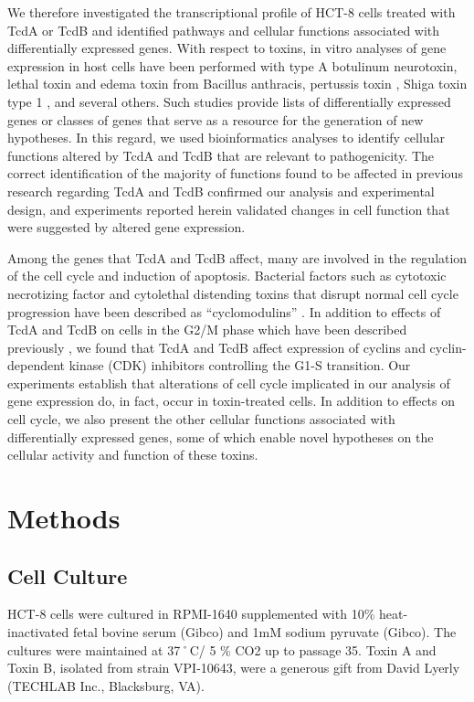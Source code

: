 We therefore investigated the transcriptional profile of HCT-8 \cite{Tompkins:1974ud} cells treated with TcdA or TcdB and identified pathways and cellular functions associated with differentially expressed genes. With respect to toxins, in vitro analyses of gene expression in host cells have been performed with type A botulinum neurotoxin, lethal toxin \cite{Comer:2005iza} and edema toxin \cite{Comer:2006wta} from Bacillus anthracis, pertussis toxin \cite{Lu:2008cr}, Shiga toxin type 1 \cite{LeyvaIllades:2010fv}, and several others. Such studies provide lists of differentially expressed genes or classes of genes that serve as a resource for the generation of new hypotheses. In this regard, we used bioinformatics analyses to identify cellular functions altered by TcdA and TcdB that are relevant to pathogenicity. The correct identification of the majority of functions found to be affected in previous research regarding TcdA and TcdB confirmed our analysis and experimental design, and experiments reported herein validated changes in cell function that were suggested by altered gene expression.

Among the genes that TcdA and TcdB affect, many are involved in the regulation of the cell cycle and induction of apoptosis. Bacterial factors such as cytotoxic necrotizing factor and cytolethal distending toxins that disrupt normal cell cycle progression have been described as “cyclomodulins” \cite{Nougayrede:2005dm}. In addition to effects of TcdA and TcdB on cells in the G2/M phase which have been described previously \cite{Fiorentini:1998uh,Kim:2005jk,Gerhard:2008wz,Nottrott:2007ep}, we found that TcdA and TcdB affect expression of cyclins and cyclin-dependent kinase (CDK) inhibitors controlling the G1-S transition. Our experiments establish that alterations of cell cycle implicated in our analysis of gene expression do, in fact, occur in toxin-treated cells. In addition to effects on cell cycle, we also present the other cellular functions associated with differentially expressed genes, some of which enable novel hypotheses on the cellular activity and function of these toxins.

\section{Methods}

\subsection{Cell Culture}
HCT-8 cells were cultured in RPMI-1640 supplemented with 10\% heat-inactivated fetal bovine serum (Gibco) and 1mM sodium pyruvate (Gibco).  The cultures were maintained at 37˚C/ 5 \% CO2 up to passage 35. Toxin A and Toxin B, isolated from strain VPI-10643, were a generous gift from David Lyerly (TECHLAB Inc., Blacksburg, VA).

